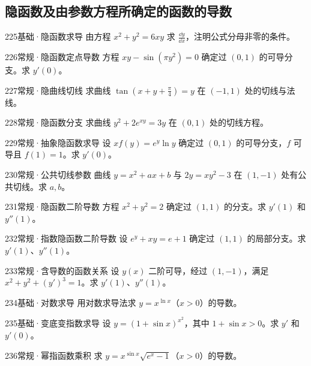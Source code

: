\subsection{隐函数及由参数方程所确定的函数的导数}
\begin{exercise}{225}{基础·隐函数求导}
由方程 $x^2+y^2=6xy$ 求 $\frac{\dd y}{\dd x}$，注明公式分母非零的条件。
\end{exercise}
\begin{exercise}{226}{常规·隐函数定点导数}
方程 $xy-\sin(\pi y^2)=0$ 确定过 $(0,1)$ 的可导分支。求 $y'(0)$。
\end{exercise}
\begin{exercise}{227}{常规·隐曲线切线}
求曲线 $\tan(x+y+\frac{\pi}{4})=y$ 在 $(-1,1)$ 处的切线与法线。
\end{exercise}
\begin{exercise}{228}{常规·隐函数分支}
求曲线 $y^2+2e^{xy}=3y$ 在 $(0,1)$ 处的切线方程。
\end{exercise}
\begin{exercise}{229}{常规·抽象隐函数求导}
设 $xf(y)=e^y\ln y$ 确定过 $(0,1)$ 的可导分支，$f$ 可导且 $f(1)=1$。求 $y'(0)$。
\end{exercise}
\begin{exercise}{230}{常规·公共切线参数}
曲线 $y=x^2+ax+b$ 与 $2y=xy^2-3$ 在 $(1,-1)$ 处有公共切线。求 $a,b$。
\end{exercise}
\begin{exercise}{231}{常规·隐函数二阶导数}
方程 $x^2+y^2=2$ 确定过 $(1,1)$ 的分支。求 $y'(1)$ 和 $y''(1)$。
\end{exercise}
\begin{exercise}{232}{常规·指数隐函数二阶导数}
设 $e^y+xy=e+1$ 确定过 $(1,1)$ 的局部分支。求 $y'(1)$、$y''(1)$。
\end{exercise}
\begin{exercise}{233}{常规·含导数的函数关系}
设 $y(x)$ 二阶可导，经过 $(1,-1)$，满足 $x^2+y^2+(y')^3=1$。求 $y'(1)$、$y''(1)$。
\end{exercise}
\begin{exercise}{234}{基础·对数求导}
用对数求导法求 $y=x^{\ln x}$（$x>0$）的导数。
\end{exercise}
\begin{exercise}{235}{基础·变底变指数求导}
设 $y=(1+\sin x)^{x^2}$，其中 $1+\sin x>0$。求 $y'$ 和 $y'(0)$。
\end{exercise}
\begin{exercise}{236}{常规·幂指函数乘积}
求 $y=x^{\sin x}\sqrt{e^x-1}$（$x>0$）的导数。
\end{exercise}
